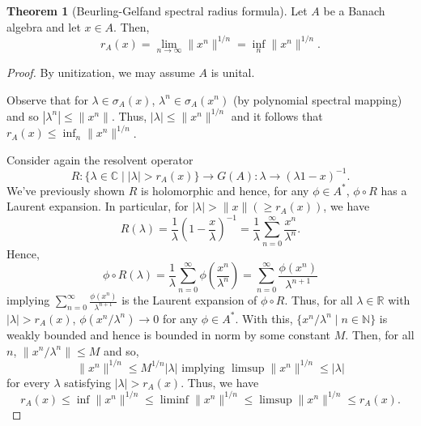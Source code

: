 \documentclass[]{article}
\theoremstyle{definition}
\newtheorem{theorem}{Theorem}
\begin{document}
\begin{theorem}[Beurling-Gelfand spectral radius formula]
  Let \(A\) be a Banach algebra and let \(x \in A\). Then, 
  \[r_A(x) = \lim_{n \to \infty}\|x^n\|^{1 / n} = \inf_n \|x^n\|^{1 / n}.\]
\end{theorem}
\begin{proof}
  By unitization, we may assume \(A\) is unital. 

  Observe that for \(\lambda \in \sigma_A(x)\), \(\lambda^n \in \sigma_A(x^n)\) (by polynomial 
  spectral mapping) and so \(|\lambda^n| \le \|x^n\|\). Thus, \(|\lambda| \le \|x^n\|^{1 / n}\) and 
  it follows that \(r_A(x) \le \inf_n \|x^n\|^{1 / n}\).

  Consider again the resolvent operator
  \[R : \{\lambda \in \mathbb{C} \mid |\lambda| > r_A(x)\} \to G(A) : \lambda \to (\lambda 1 - x)^{-1}.\]
  We've previously shown \(R\) is holomorphic and hence, for any \(\phi \in A^*\), \(\phi \circ R\) 
  has a Laurent expansion. In particular, for \(|\lambda| > \|x\| (\ge r_A(x))\), we have 
  \[R(\lambda) = \frac{1}{\lambda}\left(1 - \frac{x}{\lambda}\right)^{-1} 
    = \frac{1}{\lambda}\sum_{n = 0}^\infty \frac{x^n}{\lambda^n}.\]
  Hence, 
  \[\phi \circ R(\lambda) = \frac{1}{\lambda} \sum_{n = 0}^\infty \phi\left(\frac{x^n}{\lambda^n}\right)
    = \sum_{n = 0}^\infty \frac{\phi(x^n)}{\lambda^{n + 1}}\]
  implying \(\sum_{n = 0}^\infty \frac{\phi(x^n)}{\lambda^{n + 1}}\) is the Laurent expansion of \(\phi \circ R\).
  Thus, for all \(\lambda \in \mathbb{R}\) with \(|\lambda| > r_A(x)\), \(\phi(x^n / \lambda^n) \to 0\) for
  any \(\phi \in A^*\). With this, \(\{x^n / \lambda^n \mid n \in \mathbb{N}\}\) is weakly bounded and hence 
  is bounded in norm by some constant \(M\). Then, for all \(n\), \(\|x^n / \lambda^n\| \le M\) and so, 
  \[\|x^n\|^{1 / n} \le M^{1 / n}|\lambda| \text{ implying } \limsup \|x^n\|^{1 / n} \le |\lambda|\]
  for every \(\lambda\) satisfying \(|\lambda| > r_A(x)\). Thus, we have 
  \[r_A(x) \le \inf \|x^n\|^{1 / n} \le \liminf \|x^n\|^{1 / n} \le \limsup \|x^n\|^{1 / n} \le r_A(x).\] 
\end{proof}
\end{document}
